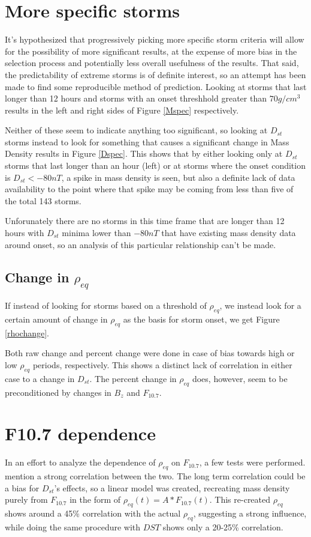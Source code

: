 \documentclass[10pt,twocolumn]{article}
\begin{document}
\section{More specific storms}
It's hypothesized that progressively picking more specific storm criteria will allow for the possibility of more significant results, at the expense of more bias in the selection process and potentially less overall usefulness of the results. That said, the predictability of extreme storms is of definite interest, so an attempt has been made to find some reproducible method of prediction. Looking at storms that last longer than 12 hours and storms with an onset threshhold greater than $70g/cm^3$ results in the left and right sides of Figure \ref{Mspec} respectively.



Neither of these seem to indicate anything too significant, so looking at $D_{st}$ storms instead to look for something that causes a significant change in Mass Density results in Figure \ref{Dspec}. This shows that by either looking only at $D_{st}$ storms that last longer than an hour (left) or at storms where the onset condition is $D_{st}<-80nT$, a spike in mass density is seen, but also a definite lack of data availability to the point where that spike may be coming from less than five of the total 143 storms. 



Unforunately there are no storms in this time frame that are longer than 12 hours with $D_{st}$ minima lower than $-80nT$ that have existing mass density data around onset, so an analysis of this particular relationship can't be made.

\subsection{Change in $\rho_{eq}$}
If instead of looking for storms based on a threshold of $\rho_{eq}$, we instead look for a certain amount of change in $\rho_{eq}$ as the basis for storm onset, we get Figure \ref{rhochange}.



Both raw change and percent change were done in case of bias towards high or low $\rho_{eq}$ periods, respectively. This shows a distinct lack of correlation in either case to a change in $D_{st}$. The percent change in $\rho_{eq}$ does, however, seem to be preconditioned by changes in $B_z$ and $F_{10.7}$.



\section{F10.7 dependence}
In an effort to analyze the dependence of $\rho_{eq}$ on $F_{10.7}$, a few tests were performed. \cite{Takahashi2010} mention a strong correlation between the two. The long term correlation could be a bias for $D_{st}$'s effects, so a linear model was created, recreating mass density purely from $F_{10.7}$ in the form of $\rho_{eq}(t)=A*F_{10.7}(t)$. This re-created $\rho_{eq}$ shows around a 45\% correlation with the actual $\rho_{eq}$, suggesting a strong influence, while doing the same procedure with $DST$ shows only a 20-25\% correlation. 
\end{document}
